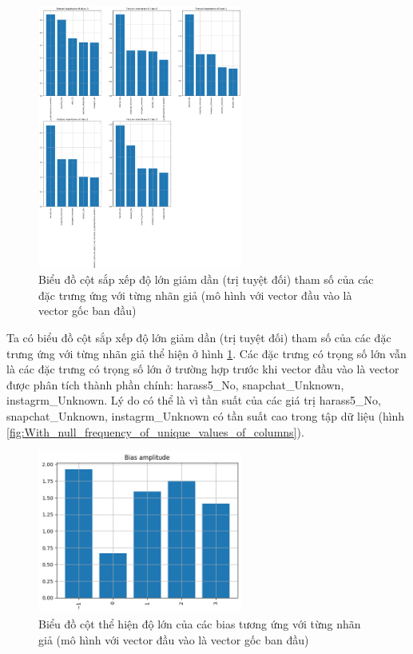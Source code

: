 \begin{enumerate}[label=(\alph*)]
    \begin{figure}[H]
        \centering
        \includegraphics[width=0.6\textwidth]{figures/Thanh/Data_Analysis/With_null_Feature_Importance_Logistic_original_features.png}
        \caption{Biểu đồ cột sắp xếp độ lớn giảm dần (trị tuyệt đối) tham số của các đặc trưng ứng với từng nhãn giả (mô hình với vector đầu vào là vector gốc ban đầu)}
        \label{fig:With_null_Feature_Importance_Logistic_original_features}
    \end{figure}

    Ta có biểu đồ cột sắp xếp độ lớn giảm dần (trị tuyệt đối) tham số của các đặc trưng ứng với từng nhãn giả thể hiện ở hình \ref{fig:With_null_Feature_Importance_Logistic_original_features}.
    Các đặc trưng có trọng số lớn vẫn là các đặc trưng có trọng số lớn ở trường hợp trước khi vector đầu vào là vector được phân tích thành phần chính: harass5\_No, snapchat\_Unknown, instagrm\_Unknown.
    Lý do có thể là vì tần suất của các giá trị harass5\_No, snapchat\_Unknown, instagrm\_Unknown có tần suất cao trong tập dữ liệu (hình \ref{fig:With_null_frequency_of_unique_values_of_columns}).

    \begin{figure}[H]
        \centering
        \includegraphics[width=0.6\textwidth]{figures/Thanh/Data_Analysis/With_null_Bias_Importance_Logistic_original_features.png}
        \caption{Biểu đồ cột thể hiện độ lớn của các bias tương ứng với từng nhãn giả (mô hình với vector đầu vào là vector gốc ban đầu)}
        \label{fig:With_null_Bias_Importance_Logistic_original_features}
    \end{figure}


\end{enumerate}
